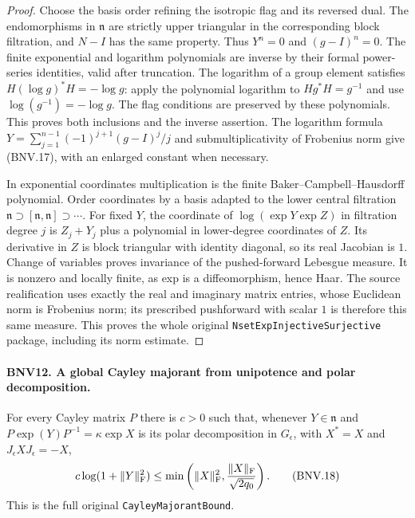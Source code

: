 \documentclass[11pt,a4paper]{article}
\numberwithin{equation}{section}
\theoremstyle{remark}\newtheorem{remark}[theorem]{Remark}
\begin{document}
\begin{proof}
Choose the basis order refining the isotropic flag and its reversed dual.
The endomorphisms in $\mathfrak n$ are strictly upper triangular in the
corresponding block filtration, and $N-I$ has the same property.  Thus
$Y^n=0$ and $(g-I)^n=0$.  The finite exponential and logarithm polynomials
are inverse by their formal power-series identities, valid after truncation.
The logarithm of a group element satisfies $H(\log g)^*H=-\log g$:
apply the polynomial logarithm to $Hg^*H=g^{-1}$ and use
$\log(g^{-1})=-\log g$.  The flag conditions are preserved by these
polynomials.  This proves both inclusions and the inverse assertion.
The logarithm formula
$Y=\sum_{j=1}^{n-1}(-1)^{j+1}(g-I)^j/j$
and submultiplicativity of Frobenius norm give (BNV.17), with an enlarged
constant when necessary.

In exponential coordinates multiplication is the finite
Baker--Campbell--Hausdorff polynomial.  Order coordinates by a basis
adapted to the lower central filtration
$\mathfrak n\supset[\mathfrak n,\mathfrak n]\supset\cdots$.
For fixed $Y$, the coordinate of $\log(\exp Y\exp Z)$ in filtration
degree $j$ is $Z_j+Y_j$ plus a polynomial in lower-degree coordinates
of $Z$.  Its derivative in $Z$ is block triangular with identity diagonal,
so its real Jacobian is $1$.  Change of variables proves invariance of
the pushed-forward Lebesgue measure.  It is nonzero and locally finite,
as exp is a diffeomorphism, hence Haar.  The source realification uses
exactly the real and imaginary matrix entries, whose Euclidean norm is
Frobenius norm; its prescribed pushforward with scalar $1$ is therefore
this same measure.  This proves the whole original
\texttt{Nset\allowbreak Exp\allowbreak Injective\allowbreak Surjective} package, including its norm estimate.
\end{proof}

\paragraph{BNV12. A global Cayley majorant from unipotence and polar decomposition.}
\label{claim:BNV12}
For every Cayley matrix $P$ there is $c>0$ such that, whenever
$Y\in\mathfrak n$ and $P\exp(Y)P^{-1}=\kappa\exp X$ is its polar
decomposition in $G_\epsilon$, with $X^*=X$ and $J_\epsilon XJ_\epsilon=-X$,
\[
 c\log(1+\|Y\|_{\rm F}^2)
 \le\min\left(\|X\|_{\rm F}^2,
                  \frac{\|X\|_{\rm F}}{\sqrt{2q_0}}\right).
 \tag{BNV.18}
\]
This is the full original \texttt{Cayley\allowbreak Majorant\allowbreak Bound}.
\end{document}
